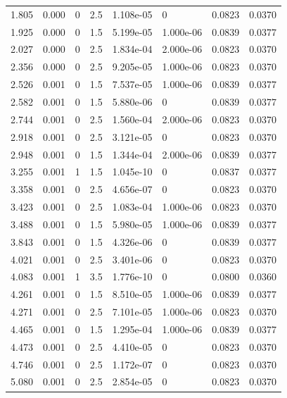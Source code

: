 \documentclass[preview]{standalone}
\begin{document}
{{\begin{tabular}{L{1.2cm}C{1.2cm} C{0.3cm}C{0.5cm} C{1.4cm}C{1.4cm} C{1.4cm}C{1.4cm}}
  1.805  &  0.000  & 0     & 2.5 &  1.108e-05  & 0  & 0.0823 &  0.0370   \\ 
  1.925  &  0.000  & 0     & 1.5 &  5.199e-05  & 1.000e-06  & 0.0839 &  0.0377   \\ 
  2.027  &  0.000  & 0     & 2.5 &  1.834e-04  & 2.000e-06  & 0.0823 &  0.0370   \\ 
  2.356  &  0.000  & 0     & 2.5 &  9.205e-05  & 1.000e-06  & 0.0823 &  0.0370   \\ 
  2.526  &  0.001  & 0     & 1.5 &  7.537e-05  & 1.000e-06  & 0.0839 &  0.0377   \\ 
  2.582  &  0.001  & 0     & 1.5 &  5.880e-06  & 0  & 0.0839 &  0.0377   \\ 
  2.744  &  0.001  & 0     & 2.5 &  1.560e-04  & 2.000e-06  & 0.0823 &  0.0370   \\ 
  2.918  &  0.001  & 0     & 2.5 &  3.121e-05  & 0  & 0.0823 &  0.0370   \\ 
  2.948  &  0.001  & 0     & 1.5 &  1.344e-04  & 2.000e-06  & 0.0839 &  0.0377   \\ 
  3.255  &  0.001  & 1     & 1.5 &  1.045e-10  & 0  & 0.0837 &  0.0377   \\ 
  3.358  &  0.001  & 0     & 2.5 &  4.656e-07  & 0  & 0.0823 &  0.0370   \\ 
  3.423  &  0.001  & 0     & 2.5 &  1.083e-04  & 1.000e-06  & 0.0823 &  0.0370   \\ 
  3.488  &  0.001  & 0     & 1.5 &  5.980e-05  & 1.000e-06  & 0.0839 &  0.0377   \\ 
  3.843  &  0.001  & 0     & 1.5 &  4.326e-06  & 0  & 0.0839 &  0.0377   \\ 
  4.021  &  0.001  & 0     & 2.5 &  3.401e-06  & 0  & 0.0823 &  0.0370   \\ 
  4.083  &  0.001  & 1     & 3.5 &  1.776e-10  & 0  & 0.0800 &  0.0360   \\ 
  4.261  &  0.001  & 0     & 1.5 &  8.510e-05  & 1.000e-06  & 0.0839 &  0.0377   \\ 
  4.271  &  0.001  & 0     & 2.5 &  7.101e-05  & 1.000e-06  & 0.0823 &  0.0370   \\ 
  4.465  &  0.001  & 0     & 1.5 &  1.295e-04  & 1.000e-06  & 0.0839 &  0.0377   \\ 
  4.473  &  0.001  & 0     & 2.5 &  4.410e-05  & 0  & 0.0823 &  0.0370   \\ 
  4.746  &  0.001  & 0     & 2.5 &  1.172e-07  & 0  & 0.0823 &  0.0370   \\ 
  5.080  &  0.001  & 0     & 2.5 &  2.854e-05  & 0  & 0.0823 &  0.0370   \\ 

\end{tabular}}}
\end{document}

